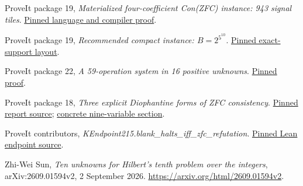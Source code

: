 \documentclass[11pt,a4paper]{article}
\theoremstyle{remark}\newtheorem{remark}[theorem]{Remark}
\newcommand{\repo}[2]{\href{https://github.com/VladimirReshetnikov/ProveIt/blob/ae3007ca4467011e0e051c84acb4a1dd13971b0e/#1}{#2}}
\begin{document}
\begin{thebibliography}{99}
 ProveIt package 19,
\emph{Materialized four-coefficient Con(ZFC) instance: 943 signal tiles}.
\repo{SetTheory/Cardinals/docs/reports/hilbert-tenth-problem/con-zfc-diophantine-forms/19-wang943/compiler/WANG943_COEFFICIENTS.md}{Pinned language and compiler proof}.

 ProveIt package 19,
\emph{Recommended compact instance: $B=2^{5^{10}}$}.
\repo{SetTheory/Cardinals/docs/reports/hilbert-tenth-problem/con-zfc-diophantine-forms/19-wang943/compiler/WANG943_COMPACT_LAYOUT.md}{Pinned exact-support layout}.

 ProveIt package 22,
\emph{A 59-operation system in 16 positive unknowns}.
\repo{SetTheory/Cardinals/docs/reports/hilbert-tenth-problem/con-zfc-diophantine-forms/22-monic12/proofs/RETAINED59_PROOF.md}{Pinned proof}.

 ProveIt package 18,
\emph{Three explicit Diophantine forms of ZFC consistency}.
\repo{SetTheory/Cardinals/docs/reports/hilbert-tenth-problem/con-zfc-diophantine-forms/18-jones9/report.tex}{Pinned report source};
\repo{SetTheory/Cardinals/docs/reports/hilbert-tenth-problem/con-zfc-diophantine-forms/18-jones9/nine/nine_section.tex}{concrete nine-variable section}.

 ProveIt contributors,
\emph{KEndpoint215.blank\_halts\_iff\_zfc\_refutation}.
\repo{Computability/BusyBeaver/Lean/BusyBeaver/ZFC/KEndpoint215.lean}{Pinned Lean endpoint source}.

 Zhi-Wei Sun,
\emph{Ten unknowns for Hilbert's tenth problem over the integers},
arXiv:2609.01594v2, 2 September 2026.
\url{https://arxiv.org/html/2609.01594v2}.
\end{thebibliography}
\end{document}
